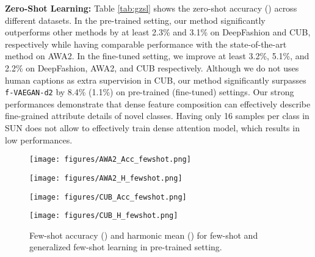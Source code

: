 \documentclass[10pt,journal,compsoc]{IEEEtran}
\newcommand{\1}{\boldsymbol{1}}
\newcommand{\0}{\boldsymbol{0}}
\newcommand{\<}{\langle}
\renewcommand{\>}{\rangle}
\newcommand{\myparagraph}[1]{\vspace{-2pt}\medskip\noindent\textbf{#1}}
\begin{document}
\myparagraph{Zero-Shot Learning:}
Table \ref{tab:gzsl} shows the zero-shot accuracy () across different datasets. In the pre-trained setting, our method significantly outperforms other methods by at least 2.3\% and 3.1\% on DeepFashion and CUB, respectively while having comparable performance with the state-of-the-art method on AWA2.
In the fine-tuned setting, we improve at least 3.2\%, 5.1\%, and 2.2\% on DeepFashion, AWA2, and CUB respectively. Although we do not uses human captions as extra supervision in CUB, our method significantly surpasses \texttt{f-VAEGAN-d2} by 8.4\% (1.1\%) on pre-trained (fine-tuned) settings.
Our strong performances demonstrate that dense feature composition can effectively describe fine-grained attribute details of novel classes.
Having only 16 samples per class in SUN does not allow to effectively train dense attention model, which results in low performances. 



\begin{figure*} 
\centering
\begin{minipage}[b]{0.24\linewidth}
  \texttt{[image: figures/AWA2\_Acc\_fewshot.png]}
  \vspace{-1mm}
\end{minipage}
\begin{minipage}[b]{0.24\linewidth}
  \texttt{[image: figures/AWA2\_H\_fewshot.png]}
    \vspace{-5mm}
\vspace{4mm}
\end{minipage}
\begin{minipage}[b]{0.24\linewidth}
  \texttt{[image: figures/CUB\_Acc\_fewshot.png]}
    \vspace{-5mm}
\vspace{4mm}
\end{minipage}
\begin{minipage}[b]{0.24\linewidth}
  \texttt{[image: figures/CUB\_H\_fewshot.png]}
    \vspace{-5mm}
\vspace{4mm}
\end{minipage}
\vspace{-3.5mm}
\caption{
\small{
Few-shot accuracy () and harmonic mean () for few-shot and generalized few-shot learning in pre-trained setting.
}
\vspace{-5mm}
}
\label{fig:few_shot_performance}
\end{figure*}
\end{document}
